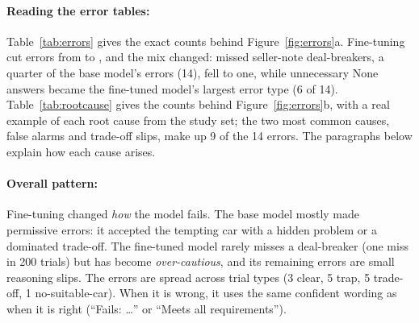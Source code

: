 \documentclass[11pt]{article}
\begin{document}
\paragraph{Reading the error tables:} Table~\ref{tab:errors} gives the exact counts behind
Figure~\ref{fig:errors}a. Fine-tuning cut errors from \BaseErrors{} to \FtErrors{}, and the mix
changed: missed seller-note deal-breakers, a quarter of the base model's errors (14), fell to one,
while unnecessary None answers became the fine-tuned model's largest error type (6 of 14).
Table~\ref{tab:rootcause} gives the counts behind Figure~\ref{fig:errors}b, with a real example of
each root cause from the study set; the two most common causes, false alarms and trade-off slips,
make up 9 of the 14 errors. The paragraphs below explain how each cause arises.

\paragraph{Overall pattern:} Fine-tuning changed \emph{how} the model fails. The base model mostly
made permissive errors: it accepted the tempting car with a hidden problem or a dominated
trade-off. The fine-tuned model rarely misses a deal-breaker (one miss in 200 trials) but has
become \emph{over-cautious}, and its remaining errors are small reasoning slips. The errors are
spread across trial types (3 clear, 5 trap, 5 trade-off, 1 no-suitable-car). When it is wrong, it
uses the same confident wording as when it is right (``Fails: \dots'' or ``Meets all
requirements'').
\end{document}
